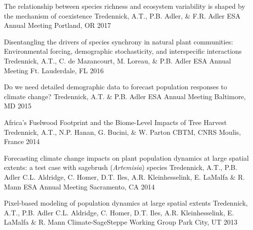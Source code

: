 

\begin{pubentries}

  \pubentry
    {The relationship between species richness and ecosystem variability is shaped by the mechanism of coexistence} %
    {Tredennick, A.T., P.B. Adler, \& F.R. Adler} %
    {ESA Annual Meeting} %
    {Portland, OR} %
    {2017} %

  \pubentry
    {Disentangling the drivers of species synchrony in natural plant communities: Environmental forcing, demographic stochasticity, and interspecific interactions} %
    {Tredennick, A.T., C. de Mazancourt, M. Loreau, \& P.B. Adler} %
    {ESA Annual Meeting} %
    {Ft. Lauderdale, FL} %
    {2016} %

  \pubentry
    {Do we need detailed demographic data to forecast population responses to climate change?} %
    {Tredennick, A.T. \& P.B. Adler} %
    {ESA Annual Meeting} %
    {Baltimore, MD} %
    {2015} %

\pubentry
    {Africa’s Fuelwood Footprint and the Biome-Level Impacts of Tree Harvest} %
    {Tredennick, A.T., N.P. Hanan, G. Bucini, \& W. Parton} %
    {CBTM, CNRS} %
    {Moulis, France} %
    {2014} %


  \pubentry
    {Forecasting climate change impacts on plant population dynamics at large spatial extents: a test case with sagebrush (\emph{Artemisia}) species} %
    {Tredennick, A.T., P.B. Adler C.L. Aldridge, C. Homer, D.T. Iles, A.R. Kleinhesselink, E. LaMalfa \& R. Mann} %
    {ESA Annual Meeting} %
    {Sacramento, CA} %
    {2014} %

\pubentry
    {Pixel-based modeling of population dynamics at large spatial extents} %
    {Tredennick, A.T., P.B. Adler C.L. Aldridge, C. Homer, D.T. Iles, A.R. Kleinhesselink, E. LaMalfa \& R. Mann} %
    {Climate-SageSteppe Working Group} %
    {Park City, UT} %
    {2013} %


\end{pubentries}

